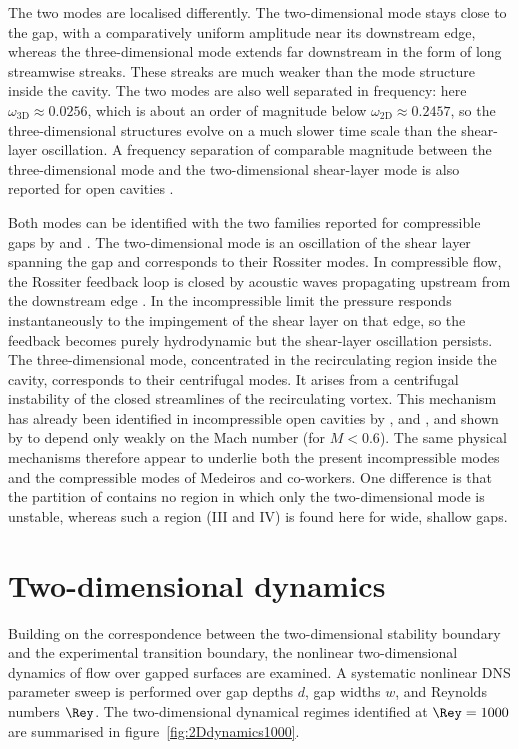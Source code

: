 \documentclass[lineno]{jfm}
\begin{document}
The two modes are localised differently. The two-dimensional mode stays close to the gap, with a comparatively uniform amplitude near its downstream edge, whereas the three-dimensional mode extends far downstream in the form of long streamwise streaks. These streaks are much weaker than the mode structure inside the cavity. The two modes are also well separated in frequency: here $\omega_{\mathrm{3D}}\approx0.0256$, which is about an order of magnitude below $\omega_{\mathrm{2D}}\approx0.2457$, so the three-dimensional structures evolve on a much slower time scale than the shear-layer oscillation. A frequency separation of comparable magnitude between the three-dimensional mode and the two-dimensional shear-layer mode is also reported for open cavities \citep{bresColonius2008}.

Both modes can be identified with the two families reported for compressible gaps by \citet{mathiasMedeiros2019,mathiasMedeiros2021} and \citet{aguirreMedeiros2024}. The two-dimensional mode is an oscillation of the shear layer spanning the gap and corresponds to their Rossiter modes. In compressible flow, the Rossiter feedback loop is closed by acoustic waves propagating upstream from the downstream edge \citep{rossiter1964}. In the incompressible limit the pressure responds instantaneously to the impingement of the shear layer on that edge, so the feedback becomes purely hydrodynamic but the shear-layer oscillation persists. The three-dimensional mode, concentrated in the recirculating region inside the cavity, corresponds to their centrifugal modes. It arises from a centrifugal instability of the closed streamlines of the recirculating vortex. This mechanism has already been identified in incompressible open cavities by \citet{meseguerGarrido2014}, \citet{deVicente2014} and \citet{Citro2015}, and shown by \citet{bresColonius2008} to depend only weakly on the Mach number (for $M<0.6$). The same physical mechanisms therefore appear to underlie both the present incompressible modes and the compressible modes of Medeiros and co-workers. One difference is that the partition of \citet{aguirreMedeiros2024} contains no region in which only the two-dimensional mode is unstable, whereas such a region (III and IV) is found here for wide, shallow gaps.

\section{Two-dimensional dynamics}\label{sec:2Ddynamics}
Building on the correspondence between the two-dimensional stability boundary and the experimental transition boundary, the nonlinear two-dimensional dynamics of flow over gapped surfaces are examined. A systematic nonlinear \ac{DNS} parameter sweep is performed over gap depths $d$, gap widths $w$, and Reynolds numbers $\Rey$. The two-dimensional dynamical regimes identified at $\Rey=1000$ are summarised in figure~\ref{fig:2Ddynamics1000}.
\end{document}
